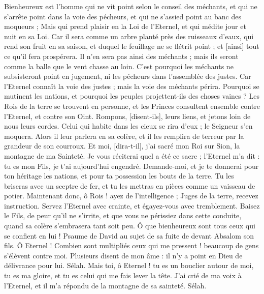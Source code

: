 \BFont
\begin{multicols}{2}
\VerseOne{}Bienheureux est l'homme qui ne vit point selon le conseil des méchants, et qui ne s'arrête point dans la voie des pécheurs, et qui ne s'assied point au banc des moqueurs ;
Mais qui prend plaisir en la Loi de l'Eternel, et qui médite jour et nuit en sa Loi.
Car il sera comme un arbre planté près des ruisseaux d'eaux, qui rend son fruit en sa saison, et duquel le feuillage ne se flétrit point ; et [ainsi] tout ce qu'il fera prospérera.
Il n'en sera pas ainsi des méchants ; mais ils seront comme la balle que le vent chasse au loin.
C'est pourquoi les méchants ne subsisteront point en jugement, ni les pécheurs dans l'assemblée des justes.
Car l'Eternel connaît la voie des justes ; mais la voie des méchants périra.
\VerseOne{}Pourquoi se mutinent les nations, et pourquoi les peuples projettent-ils des choses vaines ?
Les Rois de la terre se trouvent en personne, et les Princes consultent ensemble contre l'Eternel, et contre son Oint.
Rompons, [disent-ils], leurs liens, et jetons loin de nous leurs cordes.
Celui qui habite dans les cieux se rira d'eux ; le Seigneur s'en moquera.
Alors il leur parlera en sa colère, et il les remplira de terreur par la grandeur de son courroux.
Et moi, [dira-t-il], j'ai sacré mon Roi sur Sion, la montagne de ma Sainteté.
Je vous réciterai quel a été ce sacre ; l'Eternel m'a dit : tu es mon Fils, je t'ai aujourd'hui engendré.
Demande-moi, et je te donnerai pour ton héritage les nations, et pour ta possession les bouts de la terre.
Tu les briseras avec un sceptre de fer, et tu les mettras en pièces comme un vaisseau de potier.
Maintenant donc, ô Rois ! ayez de l'intelligence ; Juges de la terre, recevez instruction.
Servez l'Eternel avec crainte, et égayez-vous avec tremblement.
Baisez le Fils, de peur qu'il ne s'irrite, et que vous ne périssiez dans cette conduite, quand sa colère s'embrasera tant soit peu. Ô que bienheureux sont tous ceux qui se confient en lui !
\VerseOne{}Psaume de David au sujet de sa fuite de devant Absalom son fils. Ô Eternel ! Combien sont multipliés ceux qui me pressent ! beaucoup de gens s'élèvent contre moi.
Plusieurs disent de mon âme : il n'y a point en Dieu de délivrance pour lui. Sélah.
Mais toi, ô Eternel ! tu es un bouclier autour de moi, tu es ma gloire, et tu es celui qui me fais lever la tête.
J'ai crié de ma voix à l'Eternel, et il m'a répondu de la montagne de sa sainteté. Sélah.

\end{multicols}
